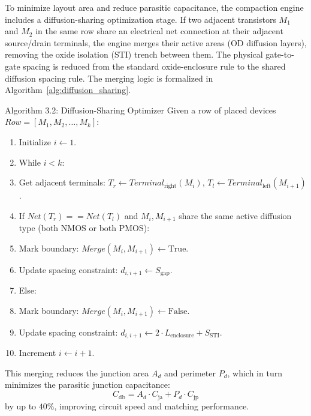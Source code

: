 To minimize layout area and reduce parasitic capacitance, the compaction engine includes a diffusion-sharing optimization stage. If two adjacent transistors $M_1$ and $M_2$ in the same row share an electrical net connection at their adjacent source/drain terminals, the engine merges their active areas (OD diffusion layers), removing the oxide isolation (STI) trench between them. The physical gate-to-gate spacing is reduced from the standard oxide-enclosure rule to the shared diffusion spacing rule. The merging logic is formalized in Algorithm~\ref{alg:diffusion_sharing}.

\begin{thesisremark}{Algorithm 3.2: Diffusion-Sharing Optimizer\label{alg:diffusion_sharing}}
  Given a row of placed devices $Row = [M_1, M_2, \dots, M_k]$:
  \begin{enumerate}
      \item Initialize $i \gets 1$.
      \item While $i < k$:
      \item \quad Get adjacent terminals: $T_r \gets Terminal_{\text{right}}(M_i)$, $T_l \gets Terminal_{\text{left}}(M_{i+1})$.
      \item \quad If $Net(T_r) == Net(T_l)$ and $M_i, M_{i+1}$ share the same active diffusion type (both NMOS or both PMOS):
      \item \quad\quad Mark boundary: $Merge(M_i, M_{i+1}) \gets \text{True}$.
      \item \quad\quad Update spacing constraint: $d_{i, i+1} \gets S_{\text{gap}}$.
      \item \quad Else:
      \item \quad\quad Mark boundary: $Merge(M_i, M_{i+1}) \gets \text{False}$.
      \item \quad\quad Update spacing constraint: $d_{i, i+1} \gets 2 \cdot L_{\text{enclosure}} + S_{\text{STI}}$.
      \item \quad Increment $i \gets i + 1$.
  \end{enumerate}
\end{thesisremark}

This merging reduces the junction area $A_d$ and perimeter $P_d$, which in turn minimizes the parasitic junction capacitance:
\begin{equation}
    C_{\text{db}} = A_d \cdot C_{\text{ja}} + P_d \cdot C_{\text{jp}}
\end{equation}
by up to $40\%$, improving circuit speed and matching performance.

\newpage
